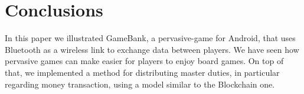 \section*{Conclusions}

In this paper we illustrated GameBank, a pervasive-game for Android, that uses 
Bluetooth as a wireless link to exchange data between players. We have seen how 
pervasive games can make easier for players to enjoy board games. On top of 
that, we implemented a method for distributing master duties, in particular 
regarding money transaction, using a model similar to the Blockchain one.